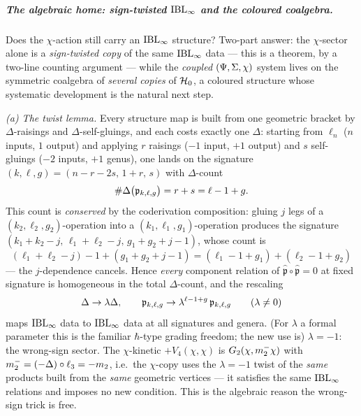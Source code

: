 \subparagraph{The algebraic home: sign-twisted $\mathrm{IBL}_\infty$ and the coloured coalgebra.} Does
the $\chi$-action still carry an $\mathrm{IBL}_\infty$ structure? Two-part answer: the $\chi$-sector
alone is a \emph{sign-twisted copy} of the same $\mathrm{IBL}_\infty$ data --- this is a theorem, by a
two-line counting argument --- while the \emph{coupled} $(\Psi,\Sigma,\chi)$ system lives
on the symmetric coalgebra of \emph{several copies} of $\mathcal{H}_0$, a coloured structure
whose systematic development is the natural next step.

\emph{(a) The twist lemma.} Every structure map is built from one geometric bracket by
$\Delta$-raisings and $\Delta$-self-gluings, and each costs exactly one $\Delta$:
starting from $\ell_n$ ($n$ inputs, $1$ output) and applying $r$ raisings ($-1$ input,
$+1$ output) and $s$ self-gluings ($-2$ inputs, $+1$ genus), one lands on the signature
$(k,\ell,g)=(n-r-2s,\,1+r,\,s)$ with $\Delta$-count
\begin{equation}
	\#\Delta\big(\mathfrak{p}_{k,\ell,g}\big)=r+s=\ell-1+g.
	\label{ped:eq:deltacount}
\end{equation}
This count is \emph{conserved} by the coderivation composition: gluing $j$ legs of a
$(k_2,\ell_2,g_2)$-operation into a $(k_1,\ell_1,g_1)$-operation produces the signature
$(k_1{+}k_2{-}j,\,\ell_1{+}\ell_2{-}j,\,g_1{+}g_2{+}j{-}1)$, whose count is
\begin{equation}
	(\ell_1{+}\ell_2{-}j)-1+(g_1{+}g_2{+}j{-}1)
	=(\ell_1{-}1{+}g_1)+(\ell_2{-}1{+}g_2)
	\label{ped:eq:deltaconserved}
\end{equation}
--- the $j$-dependence cancels. Hence \emph{every} component relation of
$\hat{\mathfrak p}\circ\hat{\mathfrak p}=0$ at fixed signature is homogeneous in the
total $\Delta$-count, and the rescaling
\begin{equation}
	\Delta\to\lambda\Delta,
	\qquad
	\mathfrak{p}_{k,\ell,g}\to\lambda^{\ell-1+g}\,\mathfrak{p}_{k,\ell,g}
	\qquad(\lambda\neq0)
	\label{ped:eq:lambdatwist}
\end{equation}
maps $\mathrm{IBL}_\infty$ data to $\mathrm{IBL}_\infty$ data at all signatures and genera. (For $\lambda$ a formal
parameter this is the familiar $\hbar$-type grading freedom; the new use is)
$\lambda=-1$: the wrong-sign sector. The $\chi$-kinetic $+V_4(\chi,\chi)$ is
$G_2(\chi,m_2^-\chi)$ with $m_2^-=(-\Delta)\circ\ell_3=-m_2$, i.e.\ the
$\chi$-copy uses the $\lambda=-1$ twist of the \emph{same} products built from the
\emph{same} geometric vertices --- it satisfies the same $\mathrm{IBL}_\infty$ relations and imposes no
new condition. This is the algebraic reason the wrong-sign trick is free.

